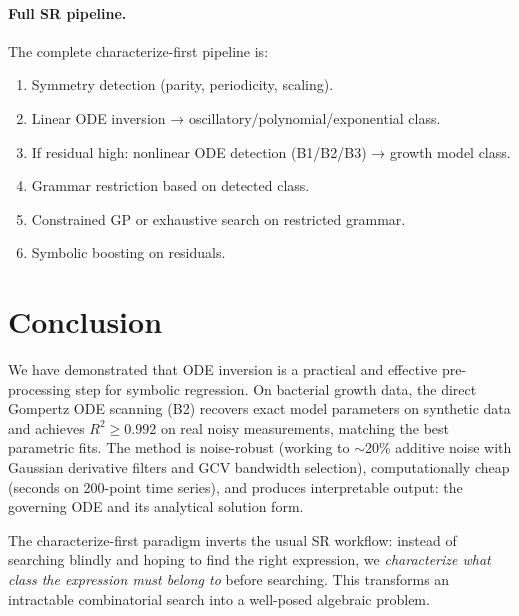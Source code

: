\documentclass[11pt,a4paper]{article}
\begin{document}
\paragraph{Full SR pipeline.}
The complete characterize-first pipeline is:
\begin{enumerate}
  \item Symmetry detection (parity, periodicity, scaling).
  \item Linear ODE inversion → oscillatory/polynomial/exponential class.
  \item If residual high: nonlinear ODE detection (B1/B2/B3) → growth model class.
  \item Grammar restriction based on detected class.
  \item Constrained GP or exhaustive search on restricted grammar.
  \item Symbolic boosting on residuals.
\end{enumerate}

\section{Conclusion}

We have demonstrated that ODE inversion is a practical and effective pre-processing step
for symbolic regression. On bacterial growth data, the direct Gompertz ODE scanning (B2)
recovers exact model parameters on synthetic data and achieves $R^2 \geq 0.992$ on real
noisy measurements, matching the best parametric fits. The method is noise-robust (working
to $\sim$20\% additive noise with Gaussian derivative filters and GCV bandwidth selection),
computationally cheap (seconds on 200-point time series), and produces interpretable output:
the governing ODE and its analytical solution form.

The characterize-first paradigm inverts the usual SR workflow: instead of searching blindly
and hoping to find the right expression, we \emph{characterize what class the expression must
belong to} before searching. This transforms an intractable combinatorial search into a
well-posed algebraic problem.
\end{document}
